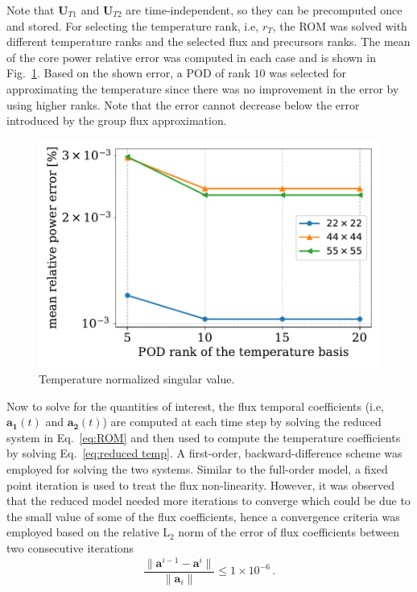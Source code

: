 \documentclass[review,number,sort&compress,12pt]{elsarticle}
\begin{document}
Note that $\mathbf{U}_{T1}$ and $\mathbf{U}_{T2}$ are time-independent, so they can be precomputed once and stored.
For selecting the temperature rank, i.e, $r_T$, the ROM was solved with different temperature ranks and the selected flux and precursors ranks.
The mean of the core power relative error was computed in each case and is shown in Fig.~\ref{fig:temperature rank}.
Based on the shown error, a POD of rank $10$ was selected for approximating the temperature since there was no improvement in the error by using higher ranks.
Note that the error cannot decrease below the error introduced by the group flux approximation.
\begin{figure}[H]
	\centering
	\includegraphics[width=1.0\linewidth]{../figures/temperature_rank_convergence.pdf}
	\caption{Temperature normalized singular value.}
	\label{fig:temperature rank}
\end{figure}
Now to solve for the quantities of interest, the flux temporal coefficients (i.e, $\mathbf{a_1}(t)$ and $\mathbf{a_2}(t)$) are computed at each time step by solving the reduced system in Eq.~\ref{eq:ROM} and then used to compute the temperature coefficients by solving Eq.~\ref{eq:reduced temp}.
A first-order, backward-difference scheme was employed for solving the two systems.
Similar to the full-order model, a fixed point iteration is used to treat the flux non-linearity.
However, it was observed that the reduced model needed more iterations to converge which could be due to the small value of some of the flux coefficients, hence a convergence criteria was employed based on the relative $\text{L}_2$ norm of the error of flux coefficients between two consecutive iterations 
\begin{equation}
\frac{\|\mathbf{a}^{i-1} - \mathbf{a}^{i}\|}{\|\mathbf{a}_i \|} \le 1\times 10^{-6}  \, .
\end{equation}
\end{document}
